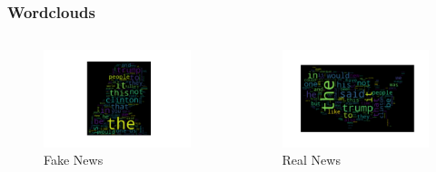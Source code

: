 \documentclass[aspectratio=1610, professionalfonts, 9pt]{beamer}
\begin{document}
  \begin{frame}
    \frametitle{Wordclouds}
    \begin{columns}
      \begin{figure}
          \includegraphics[width=\textwidth]{pictures/fake_wordcloud.pdf}
          \caption{Fake News}
          \label{}
      \end{figure}

      \begin{figure}
          \includegraphics[width=\textwidth]{pictures/real_wordcloud.pdf}
          \caption{Real News}
          \label{}
      \end{figure}
    \end{columns}
  \end{frame}
\end{document}
